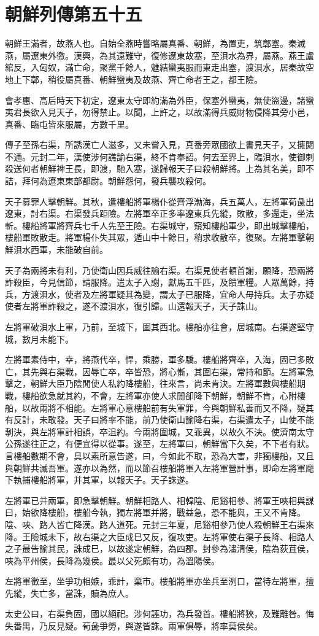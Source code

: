 \chapter{朝鮮列傳第五十五}

朝鮮王滿者，故燕人也。自始全燕時嘗略屬真番、朝鮮，為置吏，筑鄣塞。秦滅燕，屬遼東外徼。漢興，為其遠難守，復修遼東故塞，至浿水為界，屬燕。燕王盧綰反，入匈奴，滿亡命，聚黨千餘人，魋結蠻夷服而東走出塞，渡浿水，居秦故空地上下鄣，稍役屬真番、朝鮮蠻夷及故燕、齊亡命者王之，都王險。

會孝惠、高后時天下初定，遼東太守即約滿為外臣，保塞外蠻夷，無使盜邊，諸蠻夷君長欲入見天子，勿得禁止。以聞，上許之，以故滿得兵威財物侵降其旁小邑，真番、臨屯皆來服屬，方數千里。

傳子至孫右渠，所誘漢亡人滋多，又未嘗入見，真番旁眾國欲上書見天子，又擁閼不通。元封二年，漢使涉何譙諭右渠，終不肯奉詔。何去至界上，臨浿水，使御刺殺送何者朝鮮裨王長，即渡，馳入塞，遂歸報天子曰殺朝鮮將。上為其名美，即不詰，拜何為遼東東部都尉。朝鮮怨何，發兵襲攻殺何。

天子募罪人擊朝鮮。其秋，遣樓船將軍楊仆從齊浮渤海，兵五萬人，左將軍荀彘出遼東，討右渠。右渠發兵距險。左將軍卒正多率遼東兵先縱，敗散，多還走，坐法斬。樓船將軍將齊兵七千人先至王險。右渠城守，窺知樓船軍少，即出城擊樓船，樓船軍敗散走。將軍楊仆失其眾，遁山中十餘日，稍求收散卒，復聚。左將軍擊朝鮮浿水西軍，未能破自前。

天子為兩將未有利，乃使衛山因兵威往諭右渠。右渠見使者頓首謝，願降，恐兩將詐殺臣，今見信節，請服降。遣太子入謝，獻馬五千匹，及饋軍糧。人眾萬餘，持兵，方渡浿水，使者及左將軍疑其為變，謂太子已服降，宜命人毋持兵。太子亦疑使者左將軍詐殺之，遂不渡浿水，復引歸。山還報天子，天子誅山。

左將軍破浿水上軍，乃前，至城下，圍其西北。樓船亦往會，居城南。右渠遂堅守城，數月未能下。

左將軍素侍中，幸，將燕代卒，悍，乘勝，軍多驕。樓船將齊卒，入海，固已多敗亡，其先與右渠戰，因辱亡卒，卒皆恐，將心慚，其圍右渠，常持和節。左將軍急擊之，朝鮮大臣乃陰閒使人私約降樓船，往來言，尚未肯決。左將軍數與樓船期戰，樓船欲急就其約，不會，左將軍亦使人求閒卻降下朝鮮，朝鮮不肯，心附樓船，以故兩將不相能。左將軍心意樓船前有失軍罪，今與朝鮮私善而又不降，疑其有反計，未敢發。天子曰將率不能，前乃使衛山諭降右渠，右渠遣太子，山使不能剸決，與左將軍計相誤，卒沮約。今兩將圍城，又乖異，以故久不決。使濟南太守公孫遂往正之，有便宜得以從事。遂至，左將軍曰，朝鮮當下久矣，不下者有狀。言樓船數期不會，具以素所意告遂，曰，今如此不取，恐為大害，非獨樓船，又且與朝鮮共滅吾軍。遂亦以為然，而以節召樓船將軍入左將軍營計事，即命左將軍麾下執捕樓船將軍，并其軍，以報天子。天子誅遂。

左將軍已并兩軍，即急擊朝鮮。朝鮮相路人、相韓陰、尼谿相參、將軍王唊相與謀曰，始欲降樓船，樓船今執，獨左將軍并將，戰益急，恐不能與，王又不肯降。陰、唊、路人皆亡降漢。路人道死。元封三年夏，尼谿相參乃使人殺朝鮮王右渠來降。王險城未下，故右渠之大臣成巳又反，復攻吏。左將軍使右渠子長降、相路人之子最告諭其民，誅成巳，以故遂定朝鮮，為四郡。封參為澅清侯，陰為荻苴侯，唊為平州侯，長降為幾侯。最以父死頗有功，為溫陽侯。

左將軍徵至，坐爭功相嫉，乖計，棄市。樓船將軍亦坐兵至洌口，當待左將軍，擅先縱，失亡多，當誅，贖為庶人。

太史公曰，右渠負固，國以絕祀。涉何誣功，為兵發首。樓船將狹，及難離咎。悔失番禺，乃反見疑。荀彘爭勞，與遂皆誅。兩軍俱辱，將率莫侯矣。